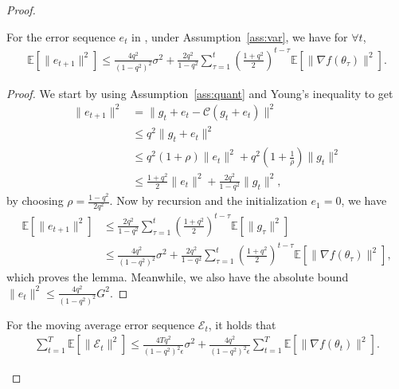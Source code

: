 \documentclass[11pt]{article}
\begin{document}
\begin{proof}
\begin{Lemma} \label{lemma:bound e_t}
For the error sequence $e_t$ in \algo, under Assumption~\ref{ass:var}, we have for $\forall t$,
\begin{align*}
    \mathbb E[\|e_{t+1}\|^2]\leq \frac{4q^2}{(1-q^2)^2}\sigma^2 + \frac{2q^2}{1-q^2}\sum_{\tau=1}^t (\frac{1+q^2}{2})^{t-\tau} \mathbb E[\|\nabla f(\theta_\tau)\|^2].
\end{align*}
\end{Lemma}

\begin{proof}
We start by using Assumption~\ref{ass:quant} and Young's inequality to get
\begin{align*}
    \|e_{t+1}\|^2&=\|g_t+e_t-\mathcal C(g_t+e_t)\|^2\\
    &\leq q^2\|g_t+e_t\|^2\\
    &\leq q^2(1+\rho)\|e_t\|^2+q^2(1+\frac{1}{\rho})\|g_t\|^2\\
    &\leq \frac{1+q^2}{2}\|e_t\|^2 + \frac{2q^2}{1-q^2}\|g_t\|^2,
\end{align*}
by choosing $\rho=\frac{1-q^2}{2q^2}$. Now by recursion and the initialization $e_1=0$, we have
\begin{align*}
    \mathbb E[\|e_{t+1}\|^2]&\leq \frac{2q^2}{1-q^2} \sum_{\tau=1}^t (\frac{1+q^2}{2})^{t-\tau} \mathbb E[\|g_\tau\|^2]\\
    &\leq \frac{4q^2}{(1-q^2)^2}\sigma^2 + \frac{2q^2}{1-q^2}\sum_{\tau=1}^t (\frac{1+q^2}{2})^{t-\tau} \mathbb E[\|\nabla f(\theta_\tau)\|^2],
\end{align*}
which proves the lemma. Meanwhile, we also have the absolute bound $\|e_{t}\|^2\leq \frac{4q^2}{(1-q^2)^2}G^2$.
\end{proof}

\begin{Lemma} \label{lemma:bound big E_t}
For the moving average error sequence $\mathcal E_t$, it holds that
\begin{align*}
    \sum_{t=1}^T \mathbb E[\|\mathcal E_t\|^2]\leq \frac{4Tq^2}{(1-q^2)^2\epsilon}\sigma^2 + \frac{4q^2}{(1-q^2)^2\epsilon} \sum_{t=1}^T \mathbb E[\|\nabla f(\theta_t)\|^2].
\end{align*}
\end{Lemma}


\end{proof}
\end{document}
